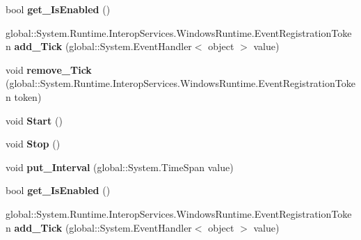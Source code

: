 \begin{DoxyCompactItemize}
bool {\bfseries get\+\_\+\+Is\+Enabled} ()
\item 
\mbox{\label{interface_windows_1_1_u_i_1_1_xaml_1_1_i_dispatcher_timer_a51cc49d4e074524b59fd3824af1b971f}} 
global\+::\+System.\+Runtime.\+Interop\+Services.\+Windows\+Runtime.\+Event\+Registration\+Token {\bfseries add\+\_\+\+Tick} (global\+::\+System.\+Event\+Handler$<$ object $>$ value)
\item 
\mbox{\label{interface_windows_1_1_u_i_1_1_xaml_1_1_i_dispatcher_timer_ad50c6aef1abbae667daedf72bb953263}} 
void {\bfseries remove\+\_\+\+Tick} (global\+::\+System.\+Runtime.\+Interop\+Services.\+Windows\+Runtime.\+Event\+Registration\+Token token)
\item 
\mbox{\label{interface_windows_1_1_u_i_1_1_xaml_1_1_i_dispatcher_timer_a684008a3b69e0e2bdfff696ff246aff6}} 
void {\bfseries Start} ()
\item 
\mbox{\label{interface_windows_1_1_u_i_1_1_xaml_1_1_i_dispatcher_timer_ab54d6b697589bdb58c5d2ae6f4cfafcc}} 
void {\bfseries Stop} ()
\item 
\mbox{\label{interface_windows_1_1_u_i_1_1_xaml_1_1_i_dispatcher_timer_a31cd041ad06e9800dd7028428f45ffce}} 
void {\bfseries put\+\_\+\+Interval} (global\+::\+System.\+Time\+Span value)
\item 
\mbox{\label{interface_windows_1_1_u_i_1_1_xaml_1_1_i_dispatcher_timer_a67b6e2e9a009502e0c91978ec3e1ffc6}} 
bool {\bfseries get\+\_\+\+Is\+Enabled} ()
\item 
\mbox{\label{interface_windows_1_1_u_i_1_1_xaml_1_1_i_dispatcher_timer_a51cc49d4e074524b59fd3824af1b971f}} 
global\+::\+System.\+Runtime.\+Interop\+Services.\+Windows\+Runtime.\+Event\+Registration\+Token {\bfseries add\+\_\+\+Tick} (global\+::\+System.\+Event\+Handler$<$ object $>$ value)
\item 
\mbox{\label{interface_windows_1_1_u_i_1_1_xaml_1_1_i_dispatcher_timer_ad50c6aef1abbae667daedf72bb953263}} 

\end{DoxyCompactItemize}
